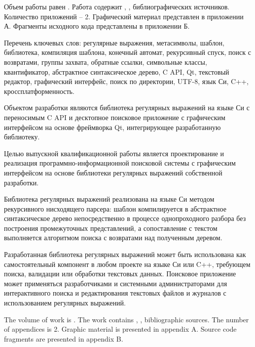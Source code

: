
Объем работы равен . Работа содержит , ,  библиографических источников. Количество приложений -- 2. Графический материал представлен в приложении А. Фрагменты исходного кода представлены в приложении Б.

Перечень ключевых слов: регулярные выражения, метасимволы, шаблон, библиотека, компиляция шаблона, конечный автомат, рекурсивный спуск, поиск с возвратами, группы захвата, обратные ссылки, символьные классы, квантификатор, абстрактное синтаксическое дерево, C API, Qt, текстовый редактор, графический интерфейс, поиск по директории, UTF-8, язык Си, C++, кроссплатформенность.

Объектом разработки являются библиотека регулярных выражений на языке Си с переносимым C API и десктопное поисковое приложение с графическим интерфейсом на основе фреймворка Qt, интегрирующее разработанную библиотеку.

Целью выпускной квалификационной работы является проектирование и реализация программно-информационной поисковой системы с графическим интерфейсом на основе библиотеки регулярных выражений собственной разработки.

Библиотека регулярных выражений реализована на языке Си методом рекурсивного нисходящего парсера: шаблон компилируется в абстрактное синтаксическое дерево непосредственно в процессе однопроходного разбора без построения промежуточных представлений, а сопоставление с текстом выполняется алгоритмом поиска с возвратами над полученным деревом.

Разработанная библиотека регулярных выражений может быть использована как самостоятельный компонент в любом проекте на языке Си или C++, требующем поиска, валидации или обработки текстовых данных. Поисковое приложение может применяться разработчиками и системными администраторами для интерактивного поиска и редактирования текстовых файлов и журналов с использованием регулярных выражений.




The volume of work is . The work contains , ,  bibliographic sources. The number of appendices is 2. Graphic material is presented in appendix A. Source code fragments are presented in appendix B.

